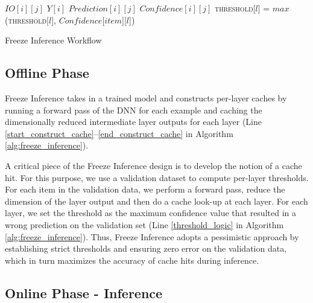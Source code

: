 \documentclass[letterpaper,twocolumn,10pt]{article}
\begin{document}
\begin{algorithm}[t!]
\begin{scriptsize}
\begin{algorithmic}[1]
    \State $IO[i][j]$ 
    \State $Y[i]$ 
    \State $Prediction[i][j]$ 
    \State $Confidence[i][j]$ 
            \State \textsc{threshold}[$l$] = $max$(\textsc{threshold}[$l$], $Confidence$[$item$][$l$]) \label{threshold_logic}
            \EndIf
        \EndFor
    \EndFor
\EndProcedure
\Statex
\end{algorithmic}
\end{scriptsize}
\caption{Freeze Inference Workflow}
\label{alg:freeze_inference}
\vspace{-0.3cm}
\end{algorithm}


\subsection{Offline Phase}

    Freeze Inference takes in a trained model and constructs per-layer caches by running a forward pass of the DNN for each example and caching the dimensionally reduced intermediate layer outputs for each layer (Line \ref{start_construct_cache}--\ref{end_construct_cache} in Algorithm \ref{alg:freeze_inference}).    
    
    A critical piece of the Freeze Inference design is to develop the notion of a cache hit. For this purpose, we use a validation dataset to compute per-layer thresholds. For each item in the validation data, we perform a forward pass, reduce the dimension of the layer output and then do a cache look-up at each layer. For each layer, we set the threshold as the maximum confidence value that resulted in a wrong prediction on the validation set (Line \ref{threshold_logic} in Algorithm \ref{alg:freeze_inference}). Thus, Freeze Inference adopts a pessimistic approach by establishing strict thresholds and ensuring zero error on the validation data, which in turn maximizes the accuracy of cache hits during inference.


\vspace{-0.4cm}
\subsection{Online Phase - Inference}
\end{document}
